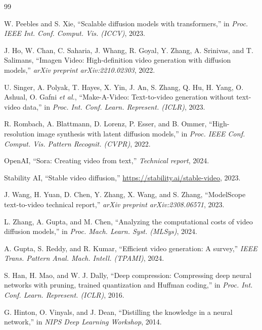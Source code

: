 \documentclass[journal,twoside]{IEEEtran}
\theoremstyle{definition}
\theoremstyle{remark}
\begin{document}
\sloppy
\begin{thebibliography}{99}

W. Peebles and S. Xie, ``Scalable diffusion models with transformers,'' in \textit{Proc. IEEE Int. Conf. Comput. Vis. (ICCV)}, 2023.

J. Ho, W. Chan, C. Saharia, J. Whang, R. Goyal, Y. Zhang, A. Srinivas, and T. Salimans, ``Imagen Video: High-definition video generation with diffusion models,'' \textit{arXiv preprint arXiv:2210.02303}, 2022.

U. Singer, A. Polyak, T. Hayes, X. Yin, J. An, S. Zhang, Q. Hu, H. Yang, O. Ashual, O. Gafni \textit{et al.}, ``Make-A-Video: Text-to-video generation without text-video data,'' in \textit{Proc. Int. Conf. Learn. Represent. (ICLR)}, 2023.

R. Rombach, A. Blattmann, D. Lorenz, P. Esser, and B. Ommer, ``High-resolution image synthesis with latent diffusion models,'' in \textit{Proc. IEEE Conf. Comput. Vis. Pattern Recognit. (CVPR)}, 2022.

OpenAI, ``Sora: Creating video from text,'' \textit{Technical report}, 2024.

Stability AI, ``Stable video diffusion,'' \url{https://stability.ai/stable-video}, 2023.

J. Wang, H. Yuan, D. Chen, Y. Zhang, X. Wang, and S. Zhang, ``ModelScope text-to-video technical report,'' \textit{arXiv preprint arXiv:2308.06571}, 2023.

L. Zhang, A. Gupta, and M. Chen, ``Analyzing the computational costs of video diffusion models,'' in \textit{Proc. Mach. Learn. Syst. (MLSys)}, 2024.

A. Gupta, S. Reddy, and R. Kumar, ``Efficient video generation: A survey,'' \textit{IEEE Trans. Pattern Anal. Mach. Intell. (TPAMI)}, 2024.

S. Han, H. Mao, and W. J. Dally, ``Deep compression: Compressing deep neural networks with pruning, trained quantization and Huffman coding,'' in \textit{Proc. Int. Conf. Learn. Represent. (ICLR)}, 2016.

G. Hinton, O. Vinyals, and J. Dean, ``Distilling the knowledge in a neural network,'' in \textit{NIPS Deep Learning Workshop}, 2014.


\end{thebibliography}
\end{document}
